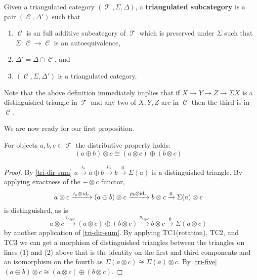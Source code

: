\documentclass[11pt]{article}
\DeclareMathOperator{\CC}{\mathcal{C}}
\DeclareMathOperator{\TT}{\mathcal{T}}
\begin{document}
\begin{defn}
Given a triangulated category $(\TT,\Sigma,\Delta)$, a \textbf{triangulated subcategory} is a pair $(\CC,\Delta')$ such that
\begin{enumerate}[1.]
	\item $\CC$ is an full additive subcategory of $\TT$ which is preserved under $\Sigma$ such that $\Sigma: \CC \to \CC$ is an autoequivalence,
	\item $\Delta' = \Delta \cap \CC$, and
	\item $(\CC,\Sigma,\Delta')$ is a triangulated category.
\end{enumerate}
\end{defn}

\begin{rmk}\label{rmk:ConeClosure}
Note that the above definition immediately implies that if $X \to Y \to Z \to \Sigma X$ is a distinguished triangle in $\TT$ and any two of $X,Y,Z$ are in $\CC$ then the third is in $\CC$.
\end{rmk}

We are now ready for our first proposition.

\begin{prop}
For objects $a,b,c \in \TT$ the distributive property holds:
\[
	(a \oplus b) \otimes c \cong (a \otimes c) \oplus (b \otimes c)
\]
\end{prop}
\begin{proof}\label{distribute}
By \autoref{tri-dir-sum} $a \xrightarrow{i_a} a \oplus b \xrightarrow{p_b} b \xrightarrow{0} \Sigma(a) $ is a distinguished triangle. By applying exactness of the $- \otimes c$ functor,
\begin{equation}
	a \otimes c \xrightarrow{i_a \otimes id_c} (a \oplus b) \otimes c \xrightarrow{p_b \otimes \operatorname{id}_c} b \otimes c \xrightarrow{ 0} \Sigma(a) \otimes c
\end{equation}
is distinguished, as is
\begin{equation}
	a \otimes c \xrightarrow{i_{a \otimes c}} (a \otimes c) \oplus (b \otimes c) \xrightarrow{p_{b \otimes c}} b \otimes c \xrightarrow{0} \Sigma(a \otimes c)
\end{equation}
by another application of \autoref{tri-dir-sum}. By applying TC1(rotation), TC2, and TC3 we can get a morphism of distinguished triangles between the triangles on lines (1) and (2) above that is the identity on the first and third components and an isomorphism on the fourth as $\Sigma(a \otimes c) \cong \Sigma(a) \otimes c$. By \autoref{tri-five} $(a \oplus b) \otimes c \cong (a \otimes c) \oplus (b \otimes c)$.
\end{proof}
\end{document}
